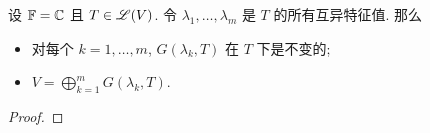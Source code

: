 \begin{theorem}
    设 \(\mathbb{F} = \mathbb{C}\) 且 \(T \in \mathscr{L}(V)\). 令 \(\lambda_1, \dots, \lambda_m\) 是 \(T\) 的所有互异特征值. 那么
    \begin{itemize}
        \item 对每个 \(k = 1, \dots, m\), \(G(\lambda_k, T)\) 在 \(T\) 下是不变的;
        \item \(V = \bigoplus_ {k = 1}^{m} G (\lambda_{k}, T)\).
    \end{itemize}
\end{theorem}
\begin{proof}

\end{proof}




